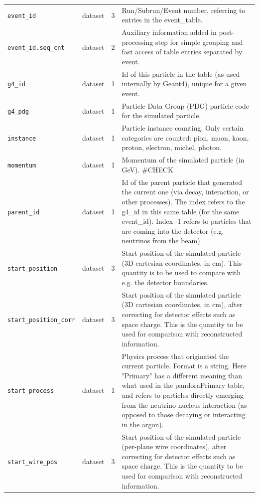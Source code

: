 \begin{longtable}{@{}p{34mm}p{10mm}p{7mm}p{100mm}@{}}
\quad\texttt{event\_id} & dataset & 3 & Run/Subrun/Event number, referring to entries in the event\_table.\\
\quad\texttt{event\_id.seq\_cnt} & dataset & 2 & Auxiliary information added in post-processing step for simple grouping and fast access of table entries separated by event.\\
\quad\texttt{g4\_id} & dataset & 1 & Id of this particle in the table (as used internally by Geant4), unique for a given event.\\
\quad\texttt{g4\_pdg} & dataset & 1 & Particle Data Group (PDG) particle code for the simulated particle.\\
\quad\texttt{instance} & dataset & 1 & Particle instance counting. Only certain categories are counted: pion, muon, kaon, proton, electron, michel, photon.\\
\quad\texttt{momentum} & dataset & 1 & Momentum of the simulated particle (in GeV). \#CHECK\\
\quad\texttt{parent\_id} & dataset & 1 & Id of the parent particle that generated the current one (via decay, interaction, or other processes). The index refers to the g4\_id in this same table (for the same event\_id). Index -1 refers to particles that are coming into the detector (e.g. neutrinos from the beam).\\
\quad\texttt{start\_position} & dataset & 3 & Start position of the simulated particle (3D cartesian coordinates, in cm). This quantity is to be used to compare with e.g. the detector boundaries.\\
\quad\texttt{start\_position\_corr} & dataset & 3 & Start position of the simulated particle (3D cartesian coordinates, in cm), after correcting for detector effects such as space charge. This is the quantity to be used for comparison with reconstructed information.\\
\quad\texttt{start\_process} & dataset & 1 & Physics process that originated the current particle. Format is a string. Here "Primary" has a different meaning than what used in the pandoraPrimary table, and refers to particles directly emerging from the neutrino-nucleus interaction (as opposed to those decaying or interacting in the argon).\\
\quad\texttt{start\_wire\_pos} & dataset & 3 & Start position of the simulated particle (per-plane wire coordinates), after correcting for detector effects such as space charge. This is the quantity to be used for comparison with reconstructed information.\\

\end{longtable}
